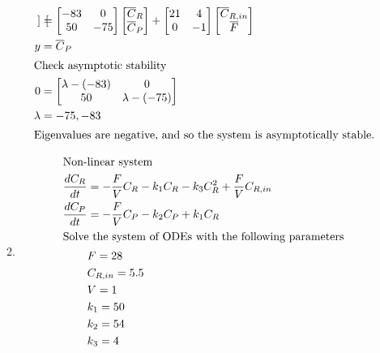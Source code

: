 \documentclass[12pt]{article}
\begin{document}
\begin{enumerate}
\begin{enumerate}
\begin{align*}
\begin{bmatrix}
        \end{bmatrix} &= \begin{bmatrix}
            -83 & 0 \\
            50 & -75 \\
        \end{bmatrix} \begin{bmatrix}
            \overline{C}_R \\
            \overline{C}_P \\
        \end{bmatrix} + \begin{bmatrix}
            21 & 4 \\
            0 & -1 \\
        \end{bmatrix} \begin{bmatrix}
            \overline{C}_{R,in} \\
            \overline{F} \\
        \end{bmatrix} \\
        y &= \overline{C}_P \\
        \intertext{Check asymptotic stability}
        0 &= \begin{bmatrix}
            \lambda-(-83) & 0 \\
            50 & \lambda-(-75) \\
        \end{bmatrix} \\
        \lambda &= -75, -83 \\
        \intertext{Eigenvalues are negative, and so the system is asymptotically stable.}
    \end{align*}
    \item 
    \begin{align*}
        \intertext{Non-linear system}
        \frac{dC_R}{dt} &= -\frac{F}{V} C_R - k_1 C_R - k_3 C_R^2 + \frac{F}{V} C_{R,in} \\
        \frac{dC_P}{dt} &= -\frac{F}{V} C_P - k_2 C_P + k_1 C_R \\
        \intertext{Solve the system of ODEs with the following parameters}
        & F = 28 \\
        & C_{R,in} = 5.5 \\
        & V = 1 \\
        & k_1 = 50 \\
        & k_2 = 54 \\
        & k_3 = 4 \\

\end{align*}
\end{enumerate}
\end{enumerate}
\end{document}
